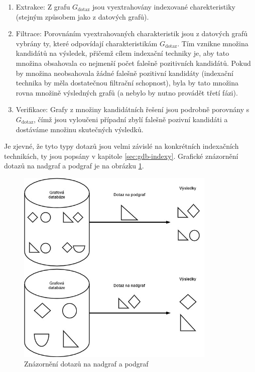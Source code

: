 \begin{enumerate}
	\item{Extrakce:} Z grafu \textit{$G_\mathrm{dotaz}$} jsou vyextrahovány indexované charekteristiky (stejným způsobem jako z datových grafů).
	\item{Filtrace:} Porovnáním vyextrahovaných charakteristik jsou z datových grafů vybrány ty, které odpovídají charakteristikám \textit{$G_\mathrm{dotaz}$}. Tím vznikne množina kandidátů na výsledek, přičemž cílem indexační techniky je, aby tato množina obsahovala co nejmenší počet falešně pozitivních kandidátů. Pokud by množina neobsahovala žádné falešně pozitivní kandidáty (indexační technika by měla dostatečnou filtrační schopnost), byla by tato množina rovna množině výsledných grafů (a nebylo by nutno provádět třetí fázi).
	\item{Verifikace:} Grafy z množiny kandidátních řešení jsou podrobně porovnány s \textit{$G_\mathrm{dotaz}$}, čímž jsou vyloučeni případní zbylí falešně pozivní kandidáti a dostáváme množinu skutečných výsledků.
\end{enumerate}

Je zjevné, že tyto typy dotazů jsou velmi závislé na konkrétních indexačních technikách, ty jsou popsány v kapitole \ref{sec:gdb-indexy}. Grafické znázornění dotazů na nadgraf a podgraf je na obrázku \ref{fig:supergraph_subgraph_query}.

\begin{figure}
\begin{center}
\includegraphics[width=9.5cm]{figures/supergraph_subgraph_query}
\caption{Znázornění dotazů na nadgraf a podgraf}
\label{fig:supergraph_subgraph_query}
\end{center}
\end{figure}

